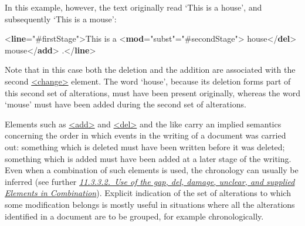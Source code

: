 In this example, however, the text originally read ‘This is a house’, and subsequently ‘This is a mouse’: \par\bgroup{}\exampleFont \begin{shaded}\noindent\mbox{}{<\textbf{line}\hspace*{1em}{change}="{\#firstStage}">}This is a {<\textbf{mod}\hspace*{1em}{type}="{subst}"\hspace*{1em}{change}="{\#secondStage}">}\mbox{}\newline 
\hspace*{1em}house{</\textbf{del}>}\mbox{}\newline 
\hspace*{1em}mouse{</\textbf{add}>}\mbox{}\newline 
{}.{</\textbf{line}>}\end{shaded}\egroup\par \noindent  Note that in this case both the deletion and the addition are associated with the second \hyperref[TEI.change]{<change>} element. The word ‘house’, because its deletion forms part of this second set of alterations, must have been present originally, whereas the word ‘mouse’ must have been added during the second set of alterations.\par
Elements such as \hyperref[TEI.add]{<add>} and \hyperref[TEI.del]{<del>} and the like carry an implied semantics concerning the order in which events in the writing of a document was carried out: something which is deleted must have been written before it was deleted; something which is added must have been added at a later stage of the writing. Even when a combination of such elements is used, the chronology can usually be inferred (see further \textit{\hyperref[PHCOMB]{11.3.3.2.\ Use of the gap, del, damage, unclear, and supplied Elements in Combination}}). Explicit indication of the set of alterations to which some modification belongs is mostly useful in situations where all the alterations identified in a document are to be grouped, for example chronologically.\par
